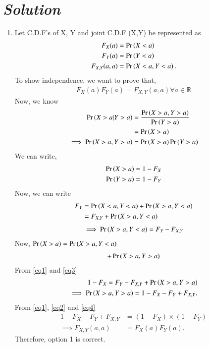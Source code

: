 \documentclass[journal,12pt,twocolumn]{IEEEtran}
\begin{document}
\section*{\emph{Solution}}
\begin{enumerate}

\item Let C.D.F's of X, Y and joint C.D.F (X,Y) be represented as
\begin{align}
    F_X(a) &= \Pr\left(X < a\right)\\
    F_Y(a) &= \Pr\left(Y < a\right)\\
    F_{X,Y}(a,a) &= \Pr\left(X < a, Y < a\right).
\end{align}
To show independence, we want to prove that,
\begin{align}
    F_X(a)F_Y(a) = F_{X, Y}(a,a) \forall a \in \mathbb{R}
\end{align}
Now, we know
\begin{align}
    \Pr\left(X>a|Y>a\right) &= \frac{\Pr\left(X>a, Y>a\right)}{\Pr\left(Y>a\right)}\\
    &= \Pr\left(X>a\right)\\
    \implies \Pr\left(X>a, Y>a\right) &= \Pr\left(X>a\right) \Pr\left(Y>a\right)
\end{align}
We can write, 
\begin{align}
    \Pr\left(X>a\right) &= 1 - F_X\label{eq1}\\
    \Pr\left(Y>a\right) &= 1 - F_Y\label{eq2}
\end{align}
Now, we can write
\begin{align}
    F_Y &= \Pr\left(X<a, Y<a\right) + \Pr\left(X>a, Y<a\right)\\
    &= F_{X,Y} + \Pr\left(X>a, Y<a\right)
\end{align}
\begin{align}
\implies \Pr\left(X>a, Y<a\right) = F_Y - F_{X,Y}\label{eq3}
\end{align}
Now, 
\begin{math}
\Pr\left(X>a\right)=\Pr\left(X>a, Y<a\right)
\end{math}
\begin{align}
    +\Pr\left(X>a, Y>a\right)
\end{align}
From \eqref{eq1} and \eqref{eq3}
\begin{align}
    1 - F_X = F_Y - F_{X,Y} + \Pr\left(X>a, Y>a\right)\\
    \implies \Pr\left(X>a, Y>a\right) = 1 - F_X - F_Y + F_{X,Y}.\label{eq4}
\end{align}
From \eqref{eq1}, \eqref{eq2} and \eqref{eq4}
\begin{align}
    1 - F_X - F_Y + F_{X,Y} &= (1 - F_X) \times (1 - F_Y)\\
    \implies F_{X, Y}(a,a) &= F_X(a)F_Y(a).
\end{align}
Therefore, option 1 is correct.
    

\end{enumerate}
\end{document}
